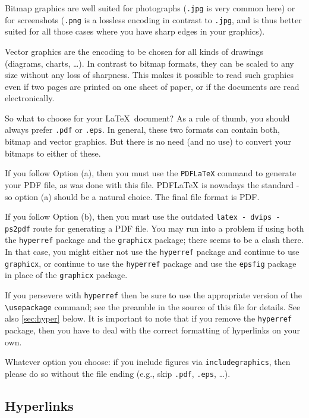 \documentclass{scspaperproc}
\theoremstyle{scsthe}
\begin{document}
Bitmap graphics are well suited for photographs (\texttt{.jpg} is very common here) or for screenshots (\texttt{.png} is a lossless encoding in contrast to \texttt{.jpg}, and is thus better suited for all those cases where you have sharp edges in your graphics).

Vector graphics are the encoding to be chosen for all kinds of drawings (diagrams, charts, \ldots). In contrast to bitmap formats, they can be scaled to any size without any loss of sharpness. This makes it possible to read such graphics even if two pages are printed on one sheet of paper, or if the documents are read electronically.

So what to choose for your \LaTeX\ document? As a rule of thumb, you should always prefer \texttt{.pdf} or \texttt{.eps}.
In general, these two formats can contain both, bitmap and vector graphics. But there is no need (and no use) to convert your bitmaps to either of these.

If you follow Option (a), then you must use the \texttt{PDFLaTeX} command to generate your PDF file, as was done with this file. PDFLaTeX is nowadays the standard - so option (a) should be a natural choice. The final file format is PDF.

If you follow Option (b), then you must use the outdated \texttt{latex - dvips - ps2pdf} route for generating a PDF file. You may run into a problem if using both the \texttt{hyperref} package and the \texttt{graphicx} package; there seems to be a clash there.
In that case, you might either not use the \texttt{hyperref} package and continue to use \texttt{graphicx}, or continue to use the \texttt{hyperref} package and use the \texttt{epsfig} package in place of the \texttt{graphicx} package.

If you persevere with \texttt{hyperref} then be sure to use the appropriate version of the \verb+\usepackage+ command; see the preamble in the source of this file for details. See also \autoref{sec:hyper} below. It is important to note that if you remove the \texttt{hyperref} package, then you have to deal with the correct formatting of hyperlinks on your own.

Whatever option you choose: if you include figures via \texttt{includegraphics}, then please do so without the file ending (e.g., skip \texttt{.pdf}, \texttt{.eps}, \ldots).

\subsection{Hyperlinks}
\label{sec:hyper}
\end{document}

